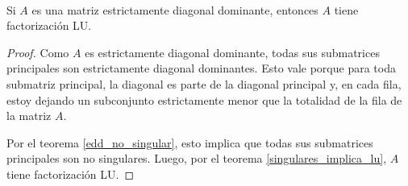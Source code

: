 \documentclass[]{article}
\begin{document}
~\newline
\begin{prop}
	Si $A$ es una matriz estrictamente diagonal dominante, entonces $A$ tiene factorización LU.
	\begin{proof}
		Como $A$ es estrictamente diagonal dominante, todas sus submatrices principales son estrictamente diagonal dominantes. Esto vale porque para toda submatriz principal, la diagonal es parte de la diagonal principal y, en cada fila, estoy dejando un subconjunto estrictamente menor que la totalidad de la fila de la matriz $A$.

		Por el teorema \ref{edd_no_singular}, esto implica que todas sus submatrices principales son no singulares. Luego, por el teorema \ref{singulares_implica_lu}, $A$ tiene factorización LU.
	\end{proof}
\end{prop}
\end{document}
